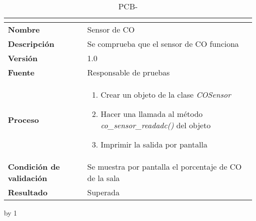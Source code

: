 \begin{table}[H]
	\caption{PCB-\number\pcb}
	\begin{tabular}{|l|p{}|}
		\hline
		\multicolumn{2}{|c|}{\cellcolor[HTML]{BFBFBF}{\color[HTML]{000000} \textbf{PCB-\number\pcb}}} \\ \hline
		\textbf{Nombre}                  & Sensor de CO                                           \\ \hline
		\textbf{Descripción}             & Se comprueba que el sensor de CO funciona              \\ \hline
		\textbf{Versión}                 & 1.0                                                    \\ \hline
		\textbf{Fuente}                  & Responsable de pruebas                                 \\ \hline
		\textbf{Proceso}                 & \begin{enumerate}
			\item Crear un objeto de la clase \textit{COSensor}
			\item Hacer una llamada al método \textit{co\_sensor\_readadc()} del objeto
			\item Imprimir la salida por pantalla
		\end{enumerate}                             \\ \hline
		\textbf{Condición de validación} & Se muestra por pantalla el porcentaje de CO de la sala \\ \hline
		\textbf{Resultado}               & Superada                                               \\ \hline
	\end{tabular}
\end{table}
\advance\pcb by 1
